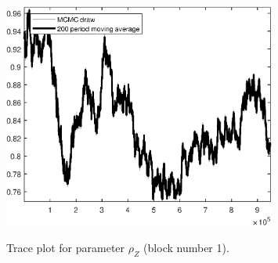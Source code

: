 \begin{figure}[H]
\centering
  \includegraphics[width=0.8\textwidth]{BRS_growth_util_sectoral/graphs/TracePlot_rho_Z_blck_1}\\
    \caption{Trace plot for parameter ${\rho_Z}$ (block number 1).}
\end{figure}
